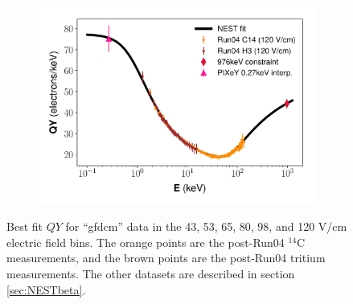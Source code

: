 \begin{figure}[h!]
\begin{subfigure}{0.5\textwidth}
  \caption{}
\end{subfigure}%
\begin{subfigure}{0.5\textwidth}
  \centering
  \includegraphics[width=\textwidth]{Figures/Yields_fit_old/NEST_fit_120Vcm_old_dcm.pdf}
  \caption{}
\end{subfigure}
\caption{Best fit $QY$ for ``gfdcm'' data in the 43, 53, 65, 80, 98, and 120 V/cm electric field bins. The orange points are the post-Run04 $^{14}$C measurements, and the brown points are the post-Run04 tritium measurements. The other datasets are described in section \ref{sec:NESTbeta}.}
\label{fig:dcm_prelim_QY1}
\end{figure}

